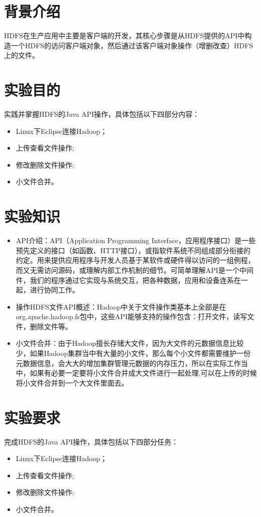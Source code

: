 \documentclass {article}
\begin{document}
	\maketitle{}
	\section{背景介绍}
		HDFS在生产应用中主要是客户端的开发，其核心步骤是从HDFS提供的API中构造一个HDFS的访问客户端对象，然后通过该客户端对象操作（增删改查）HDFS上的文件。
	
	\section{实验目的}
		实践并掌握HDFS的Java API操作，具体包括以下四部分内容：
		\begin{itemize}
			\item Linux下Eclipse连接Hadoop；
			\item 上传查看文件操作;
			\item 修改删除文件操作;
			\item 小文件合并。
		\end{itemize}

	\section{实验知识}	
		\begin{itemize}
			\item API介绍：API（Application Programming Interface，应用程序接口）是一些预先定义的接口（如函数、HTTP接口），或指软件系统不同组成部分衔接的约定。用来提供应用程序与开发人员基于某软件或硬件得以访问的一组例程，而又无需访问源码，或理解内部工作机制的细节。可简单理解API是一个中间件，我们的程序通过它实现与系统交互，把各种数据，应用和设备连系在一起，进行协同工作。
			\item
			操作HDFS文件API概述：Hadoop中关于文件操作类基本上全部是在org.apache.hadoop.fs包中，这些API能够支持的操作包含：打开文件，读写文件，删除文件等。
			\item 小文件合并：由于Hadoop擅长存储大文件，因为大文件的元数据信息比较少，如果Hadoop集群当中有大量的小文件，那么每个小文件都需要维护一份元数据信息，会大大的增加集群管理元数据的内存压力，所以在实际工作当中，如果有必要一定要将小文件合并成大文件进行一起处理,可以在上传的时候将小文件合并到一个大文件里面去。
		\end{itemize}
	
	\section{实验要求}
		完成HDFS的Java API操作，具体包括以下四部分任务：
		\begin{itemize}
			\item Linux下Eclipse连接Hadoop；
			\item 上传查看文件操作;
			\item 修改删除文件操作;
			\item 小文件合并。
		\end{itemize}
	
\end{document}
